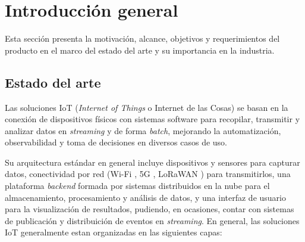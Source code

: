 
\chapter{Introducción general} %

\label{Chapter1} %
\label{IntroGeneral}

Esta sección presenta la motivación, alcance, objetivos y requerimientos del producto en el marco del estado del arte y su importancia en la industria.


\newcommand{\keyword}[1]{\textbf{#1}}
\newcommand{\tabhead}[1]{\textbf{#1}}
\newcommand{\code}[1]{\texttt{#1}}
\newcommand{\file}[1]{\texttt{\bfseries#1}}
\newcommand{\option}[1]{\texttt{\itshape#1}}
\newcommand{\grados}{$^{\circ}$}



\section{Estado del arte}

Las soluciones IoT (\textit{Internet of Things} o Internet de las Cosas) se basan en la conexión de dispositivos físicos con sistemas software para recopilar, transmitir y analizar datos en \textit{streaming} y de forma \textit{batch}, mejorando la automatización, observabilidad y toma de decisiones en diversos casos de uso. 

Su arquitectura estándar en general incluye dispositivos y sensores para capturar datos, conectividad por red (Wi-Fi \cite{wifi}, 5G \cite{5g}, LoRaWAN \cite{lorawan}) para transmitirlos, una plataforma \textit{backend} formada por sistemas distribuidos en la nube para el almacenamiento, procesamiento y análisis de datos, y una interfaz de usuario para la visualización de resultados, pudiendo, en ocasiones, contar con sistemas de publicación y distribuición de eventos en \textit{streaming}. En general, las soluciones IoT generalmente estan organizadas en las siguientes capas:

